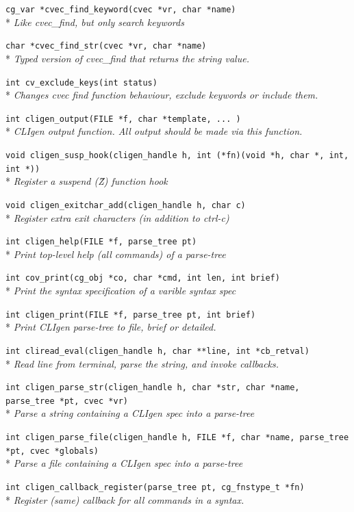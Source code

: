 \documentclass[a4paper, 10pt] {article}
\begin{document}
{{\tt cg\_var *cvec\_find\_keyword(cvec *vr, char *name)}\\*
\emph{ Like cvec\_find, but only search keywords}

{\tt char *cvec\_find\_str(cvec *vr, char *name)}\\*
\emph{  Typed version of cvec\_find that returns the string value.}

{\tt int cv\_exclude\_keys(int status)}\\*
\emph{ Changes cvec find function behaviour, exclude keywords or include them.}

{\tt int cligen\_output(FILE *f, char *template, ... )}\\*
\emph{ CLIgen output function. All output should be made via this function.}

{\tt void cligen\_susp\_hook(cligen\_handle h, int (*fn)(void *h, char *, int, int *))}\\*
\emph{ Register a suspend (\^Z) function hook }

{\tt void cligen\_exitchar\_add(cligen\_handle h, char c)}\\*
\emph{ Register extra exit characters (in addition to ctrl-c)}

{\tt int cligen\_help(FILE *f, parse\_tree pt)}\\*
\emph{ Print top-level help (all commands) of a parse-tree}

{\tt int cov\_print(cg\_obj *co, char *cmd, int len, int brief)}\\*
\emph{ Print the syntax specification of a varible syntax spec}

{\tt int cligen\_print(FILE *f, parse\_tree pt, int brief)}\\*
\emph{  Print CLIgen parse-tree to file, brief or detailed.}

{\tt int cliread\_eval(cligen\_handle h, char **line, int *cb\_retval)}\\*
\emph{ Read line from terminal, parse the string, and invoke callbacks.}

{\tt int cligen\_parse\_str(cligen\_handle h, char *str, char *name, parse\_tree *pt, cvec *vr)}\\*
\emph{ Parse a string containing a CLIgen spec into a parse-tree}

{\tt int cligen\_parse\_file(cligen\_handle h, FILE *f, char *name, parse\_tree *pt, cvec *globals)}\\*
\emph{ Parse a file containing a CLIgen spec into a parse-tree}

{\tt int cligen\_callback\_register(parse\_tree pt, cg\_fnstype\_t *fn)}\\*
\emph{  Register (same) callback for all commands in a syntax.}

}
\end{document}
